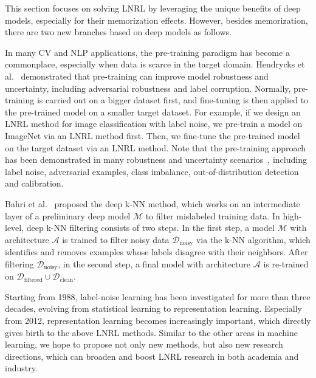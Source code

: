 This section focuses on solving LNRL by leveraging 
the unique benefits of deep models, especially for their memorization effects. However, besides memorization, there are two new branches based on deep models as follows.

In many CV and NLP applications, the pre-training paradigm has become a commonplace, especially when data is scarce in the target domain. 
Hendrycks et al.~ demonstrated that pre-training can improve model robustness and uncertainty, 
including adversarial robustness and label corruption.
Normally, pre-training is carried out on a bigger dataset first, 
and fine-tuning is then applied to the pre-trained model on a smaller target dataset. 
For example, if we design an LNRL method for image classification with label noise, we pre-train a model on ImageNet via an LNRL method first. 
Then, we fine-tune the pre-trained model on the target dataset via an LNRL method. 
Note that the pre-training approach has been demonstrated in many robustness and uncertainty scenarios~,
including label noise, adversarial examples, class imbalance, out-of-distribution detection and calibration.

Bahri et al.~ proposed the deep k-NN method, which works on an intermediate layer 
of a preliminary deep model $\mathcal{M}$ to filter mislabeled training data. In
high-level, deep k-NN filtering consists of two steps. In the first step, a model
$\mathcal{M}$ with architecture $\mathcal{A}$ is trained 
to filter noisy data $\mathcal{D}_{\text{noisy}}$ via the k-NN algorithm, which identifies and removes examples whose labels disagree with their neighbors. After filtering $\mathcal{D}_{\text{noisy}}$, 
in the second step, a final model with architecture $\mathcal{A}$ is re-trained on $\mathcal{D}_{\text{filtered}} \cup \mathcal{D}_{\text{clean}}$.

\label{sec:fuworks}
Starting from 1988, label-noise learning has been investigated for more than three decades, evolving from statistical learning to representation learning. Especially from 2012, representation learning becomes increasingly important, which directly gives birth to the above LNRL methods. Similar to the other areas in machine learning, we hope to propose not only new methods, but also new research directions, which can broaden and boost  LNRL research in both academia and industry.


